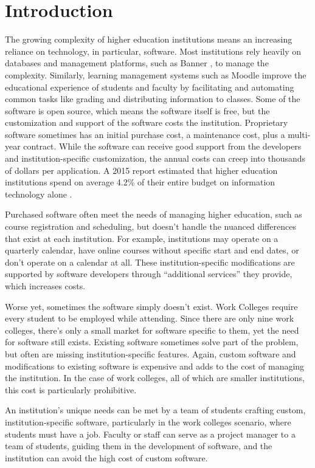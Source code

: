\section{Introduction}

The growing complexity of higher education institutions means an increasing reliance on technology, in particular, software. Most institutions rely heavily on databases and management platforms, such as Banner \cite{BannerWebsite}, to manage the complexity. Similarly, learning management systems such as Moodle \cite{MoodleWebsite}  improve the educational experience of students and faculty by facilitating and automating common tasks like grading and distributing information to classes. Some of the software is open source, which means the software itself is free, but the customization and support of the software costs the institution. Proprietary software sometimes has an initial purchase cost, a maintenance cost, plus a multi-year contract. While the software can receive good support from the developers and institution-specific customization, the annual costs can creep into thousands of dollars per application. A 2015 report estimated that higher education institutions spend on average 4.2\% of their entire budget on information technology alone \cite{CDSBenchmarkReport}. 

Purchased software often meet the needs of managing higher education, such as course registration and scheduling, but doesn't handle the nuanced differences that exist at each institution. For example, institutions may operate on a quarterly calendar, have online courses without specific start and end dates, or don't operate on a calendar at all. These institution-specific modifications are supported by software developers through ``additional services'' they provide, which increases costs.

Worse yet, sometimes the software simply doesn't exist. Work Colleges \cite{WCCMembers, Ecclesia} require every student to be employed while attending. Since there are only nine work colleges, there's only a small market for software specific to them, yet the need for software still exists. Existing software sometimes solve part of the problem, but often are missing institution-specific features. Again, custom software and modifications to existing software is expensive and adds to the cost of managing the institution. In the case of work colleges, all of which are smaller institutions, this cost is particularly prohibitive. 

An institution's unique needs can be met by a team of students crafting custom, institution-specific software, particularly in the work colleges scenario, where students must have a job. Faculty or staff can serve as a project manager to a team of students, guiding them in the development of software, and the institution can avoid the high cost of custom software. 

